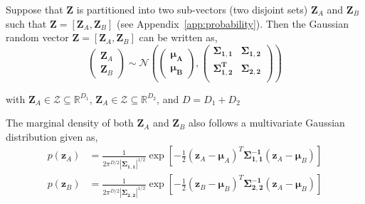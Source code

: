 Suppose that $\mathbf{Z}$ is partitioned into two sub-vectors (two disjoint sets) $\mathbf{Z}_A$ and $\mathbf{Z}_B$ such that $\mathbf{Z} = [\mathbf{Z}_A, \mathbf{Z}_B]$ 
(see Appendix~\ref{app:probability}).
Then the Gaussian random vector $\mathbf{Z} = [\mathbf{Z}_A, \mathbf{Z}_B]$ can be written as,
\begin{equation}
	\begin{pmatrix}
		 \mathbf{Z}_A \\
		 \mathbf{Z}_B
	\end{pmatrix} \sim \mathcal{N} \left (
	\begin{pmatrix}
			\boldsymbol{\mu_A} \\
			\boldsymbol{\mu_B}
	\end{pmatrix}, \begin{pmatrix}
		  \boldsymbol{\Sigma_{1,1}}   & \boldsymbol{\Sigma_{1,2}} \\
			\boldsymbol{\Sigma^T_{1,2}} & \boldsymbol{\Sigma_{2,2}} \\
	\end{pmatrix} \right)
\label{eq:gaussian_random_vector}
\end{equation}

with $\mathbf{Z}_A \in \mathcal{Z} \subseteq \mathbb{R}^{D_1}$, $\mathbf{Z}_A \in \mathcal{Z} \subseteq \mathbb{R}^{D_2}$, and $D = D_1 + D_2$ 

The marginal density of both $\mathbf{Z}_A$ and $\mathbf{Z}_B$ also follows a multivariate Gaussian distribution given as,
\begin{equation}
	\begin{split}
		p(\mathbf{z}_A) & = \frac{1}{2\pi^{D/2}|\boldsymbol{\Sigma_{1,1}}|^{1/2}} \exp{\left[-\frac{1}{2}(\mathbf{z}_A-\boldsymbol{\mu}_A)^T\boldsymbol{\Sigma^{-1}_{1,1}}(\mathbf{z}_A-\boldsymbol{\mu}_B)\right]} \\
		p(\mathbf{z}_B) & = \frac{1}{2\pi^{D/2}|\boldsymbol{\Sigma_{2,2}}|^{1/2}} \exp{\left[-\frac{1}{2}(\mathbf{z}_B-\boldsymbol{\mu}_B)^T\boldsymbol{\Sigma^{-1}_{2,2}}(\mathbf{z}_A-\boldsymbol{\mu}_B)\right]}
	\end{split}
\label{eq:gaussian_marginal}
\end{equation}

